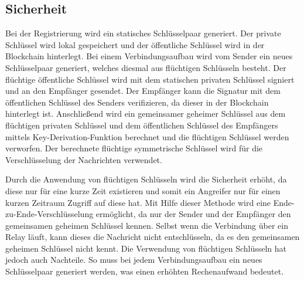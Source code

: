 \subsection{Sicherheit}
\label{subsec:sicherheit}


Bei der Registrierung wird ein statisches Schlüsselpaar generiert. Der private Schlüssel wird lokal gespeichert und der öffentliche Schlüssel wird in der Blockchain hinterlegt. Bei einem Verbindungsaufbau wird vom Sender ein neues Schlüsselpaar generiert, welches diesmal aus flüchtigen Schlüsseln besteht. Der flüchtige öffentliche Schlüssel wird mit dem statischen privaten Schlüssel signiert und an den Empfänger gesendet. Der Empfänger kann die Signatur mit dem öffentlichen Schlüssel des Senders verifizieren, da dieser in der Blockchain hinterlegt ist. Anschließend wird ein gemeinsamer geheimer Schlüssel aus dem flüchtigen privaten Schlüssel und dem öffentlichen Schlüssel des Empfängers mittels Key-Derivation-Funktion berechnet und die flüchtigen Schlüssel werden verworfen. Der berechnete flüchtige symmetrische Schlüssel wird für die Verschlüsselung der Nachrichten verwendet.

Durch die Anwendung von flüchtigen Schlüsseln wird die Sicherheit erhöht, da diese nur für eine kurze Zeit existieren und somit ein Angreifer nur für einen kurzen Zeitraum Zugriff auf diese hat.
Mit Hilfe dieser Methode wird eine Ende-zu-Ende-Verschlüsselung ermöglicht, da nur der Sender und der Empfänger den gemeinsamen geheimen Schlüssel kennen. Selbst wenn die Verbindung über ein Relay läuft, kann dieses die Nachricht nicht entschlüsseln, da es den gemeinsamen geheimen Schlüssel nicht kennt.
Die Verwendung von flüchtigen Schlüsseln hat jedoch auch Nachteile. So muss bei jedem Verbindungsaufbau ein neues Schlüsselpaar generiert werden, was einen erhöhten Rechenaufwand bedeutet. 
